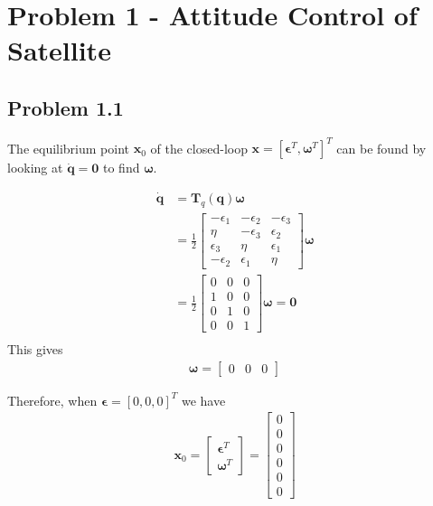 \section*{Problem 1 - Attitude Control of Satellite}

\subsection*{Problem 1.1}

The equilibrium point $\boldsymbol{x}_0$ of the closed-loop $\boldsymbol{x} = [ \boldsymbol{\epsilon}^T, \boldsymbol{\omega}^T]^T$ can be found by looking at $\dot{\boldsymbol{q}} = \boldsymbol{0}$ to find $\boldsymbol{\omega}$. 

\begin{align}
\boldsymbol{\dot{q}} &= 
\boldsymbol{T}_q(\boldsymbol{q})\boldsymbol{\omega}\\ 
&= \frac{1}{2}
\begin{bmatrix}
-\epsilon_1 & -\epsilon_2 & -\epsilon_3 \\
\eta & -\epsilon_3 & \epsilon_2 \\
\epsilon_3 & \eta & \epsilon_1 \\
-\epsilon_2 & \epsilon_1 & \eta 
\end{bmatrix}
\boldsymbol{\omega} \\
&= \frac{1}{2}
\begin{bmatrix}
0 & 0 & 0 \\
1 & 0 & 0 \\
0 & 1 & 0 \\
0 & 0 & 1
\end{bmatrix}
\boldsymbol{\omega} = \boldsymbol{0} \\
\end{align}
This gives \\
\begin{align}
   \boldsymbol{\omega}= 
   \begin{bmatrix}
   0 & 0 & 0
   \end{bmatrix}
\end{align}

Therefore, when $\boldsymbol{\epsilon}=[0 , 0 , 0]^T$ we have \\
\begin{align}
    \boldsymbol{x}_0 =
    \begin{bmatrix}
    \boldsymbol{\epsilon}^T \\
    \boldsymbol{\omega}^T
    \end{bmatrix}
    = 
    \begin{bmatrix}
    0 \\
    0 \\
    0 \\
    0 \\
    0 \\
    0
    \end{bmatrix}
\end{align}

